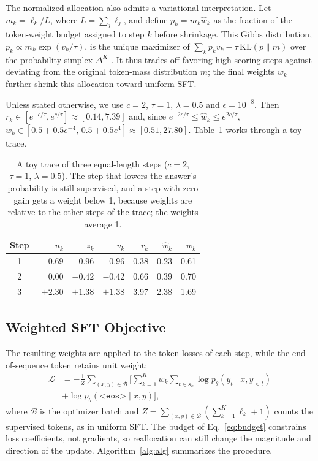 The normalized allocation also admits a variational
interpretation. Let $m_k=\ell_k/L$, where
$L=\sum_j\ell_j$, and define $p_k=m_k\hat w_k$ as
the fraction of the token-weight budget assigned to
step $k$ before shrinkage. This Gibbs distribution,
$p_k\propto m_k\exp(v_k/\tau)$, is the unique maximizer
of $\sum_kp_kv_k-\tau\,\mathrm{KL}(p\|m)$ over the
probability simplex $\Delta^K$
\citep{wainwright2008graphical}. It thus trades off
favoring high-scoring steps against deviating from the
original token-mass distribution $m$; the final weights
$w_k$ further shrink this allocation toward uniform SFT.

Unless stated otherwise, we use $c=2$, $\tau=1$, $\lambda=0.5$ and $\epsilon=10^{-8}$.
Then $r_k\in[e^{-c/\tau},e^{c/\tau}]\approx[0.14,7.39]$ and, since $e^{-2c/\tau}\le\hat w_k\le e^{2c/\tau}$, $w_k\in[0.5+0.5e^{-4},\,0.5+0.5e^{4}]\approx[0.51,27.80]$.
Table~\ref{tab:toy} works through a toy trace.


\begin{table}[t]
  \centering
  \small
  \setlength{\tabcolsep}{4pt}
  \begin{tabular}{crrrrrr}
    \toprule
    Step & $u_k$ & $z_k$ & $v_k$ & $r_k$ & $\hat w_k$ & $w_k$ \\
    \midrule
    1 & $-0.69$ & $-0.96$ & $-0.96$ & 0.38 & 0.23 & 0.61 \\
    2 & $\phantom{+}0.00$ & $-0.42$ & $-0.42$ & 0.66 & 0.39 & 0.70 \\
    3 & $+2.30$ & $+1.38$ & $+1.38$ & 3.97 & 2.38 & 1.69 \\
    \bottomrule
  \end{tabular}
  \caption{A toy trace of three equal-length steps ($c=2$, $\tau=1$, $\lambda=0.5$). The step that lowers the answer's probability is still supervised, and a step with zero gain gets a weight below 1, because weights are relative to the other steps of the trace; the weights average 1.}
  \label{tab:toy}
\end{table}


\subsection{Weighted SFT Objective}
\label{sec:objective}
The resulting weights are applied to the token losses of each step, while the end-of-sequence token retains unit weight:
\begin{equation}
\begin{split}
\mathcal{L} &=
-\frac{1}{Z}
\sum_{(x,y)\in\mathcal{B}}
\Bigg[
\sum_{k=1}^{K}
w_k
\sum_{t\in s_k}
\log p_\theta(y_t\mid x,y_{<t}) \\
&+
\log p_\theta(\texttt{<eos>}\mid x,y)
\Bigg],
\end{split}
\label{eq:loss}
\end{equation}
where $\mathcal{B}$ is the optimizer batch and $Z = \sum_{(x,y)\in\mathcal{B}} \left( \sum_{k=1}^{K}\ell_k+1 \right)$ counts the supervised tokens, as in uniform SFT.
The budget of Eq.~\ref{eq:budget} constrains loss coefficients, not gradients, so reallocation can still change the magnitude and direction of the update.
Algorithm~\ref{alg:alg} summarizes the procedure.

